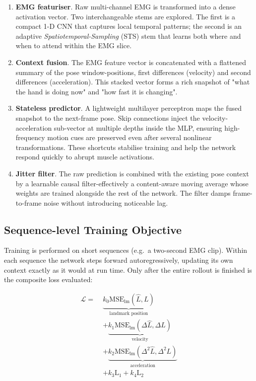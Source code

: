 \begin{enumerate}[label=\arabic*.]
  \item \textbf{EMG featuriser}.
        Raw multi-channel EMG is transformed into a dense activation vector.
        Two interchangeable stems are explored.
        The first is a compact 1-D CNN that captures local temporal patterns;
        the second is an adaptive \emph{Spatiotemporal-Sampling} (STS) stem that
        learns both where and when to attend within the EMG slice.
  \item \textbf{Context fusion}.
        The EMG feature vector is concatenated with a flattened summary of the
        pose window-positions, first differences (velocity) and second
        differences (acceleration). This stacked vector forms a rich snapshot
        of "what the hand is doing now" and "how fast it is changing".
  \item \textbf{Stateless predictor}.
        A lightweight multilayer perceptron maps the fused snapshot to the
        next-frame pose. Skip connections inject the velocity-acceleration
        sub-vector at multiple depths inside the MLP, ensuring high-frequency
        motion cues are preserved even after several nonlinear transformations.
        These shortcuts stabilise training and help the network respond quickly
        to abrupt muscle activations.
  \item \textbf{Jitter filter}.
        The raw prediction is combined with the existing pose context by a
        learnable causal filter-effectively a content-aware moving average
        whose weights are trained alongside the rest of the network. The
        filter damps frame-to-frame noise without introducing noticeable lag.
\end{enumerate}

\subsection{Sequence-level Training Objective}

Training is performed on short sequences (e.g.\ a two-second EMG clip).
Within each sequence the network steps forward autoregressively, updating its
own context exactly as it would at run time. Only after the entire rollout is
finished is the composite loss evaluated:

\begin{align*}
\mathcal{L} =\;&
\underbrace{k_0\mathrm{MSE}_{\text{lm}}(\hat L, L)}_{\text{landmark position}} \\
&+ \underbrace{k_1\mathrm{MSE}_{\text{lm}}(\Delta \hat L, \Delta L)}_{\text{velocity}} \\
&+ \underbrace{k_2\mathrm{MSE}_{\text{lm}}(\Delta^{2} \hat L, \Delta^{2} L)}_{\text{acceleration}} \\
&+ k_3\text{L}_{1} + k_4\text{L}_{2}
\end{align*}

